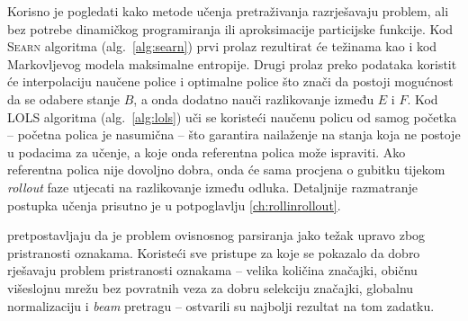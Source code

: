 Korisno je pogledati kako metode učenja pretraživanja razrješavaju problem, ali
bez potrebe dinamičkog programiranja ili aproksimacije particijske funkcije. Kod
\textsc{Searn} algoritma (alg.~\ref{alg:searn}) prvi prolaz rezultirat će
težinama kao i kod Markovljevog modela maksimalne entropije. Drugi prolaz preko
podataka koristit će interpolaciju naučene police i optimalne police što znači
da postoji mogućnost da se odabere stanje $B$, a onda dodatno nauči razlikovanje
između $E$ i $F$. Kod \textsc{LOLS} algoritma (alg.~\ref{alg:lols}) uči se
koristeći naučenu policu od samog početka -- početna polica je nasumična -- što
garantira nailaženje na stanja koja ne postoje u podacima za učenje, a koje onda
referentna polica može ispraviti. Ako referentna polica nije dovoljno dobra,
onda će sama procjena o gubitku tijekom \textit{rollout} faze utjecati na
razlikovanje između odluka. Detaljnije razmatranje postupka učenja prisutno je u
potpoglavlju \ref{ch:rollinrollout}.

\citet{andor2016globally} pretpostavljaju da je problem ovisnosnog parsiranja
jako težak upravo zbog pristranosti oznakama. Koristeći sve pristupe za koje se
pokazalo da dobro rješavaju problem pristranosti oznakama -- velika količina
značajki, običnu višeslojnu mrežu bez povratnih veza za dobru selekciju
značajki, globalnu normalizaciju i \textit{beam} pretragu -- ostvarili su
najbolji rezultat na tom zadatku.
